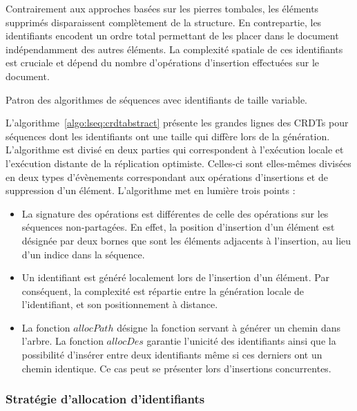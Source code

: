 Contrairement aux approches basées sur les pierres tombales, les éléments
supprimés disparaissent complètement de la structure. En contrepartie, les
identifiants encodent un ordre total permettant de les placer dans le document
indépendamment des autres éléments. La complexité spatiale de ces identifiants
est cruciale et dépend du nombre d'opérations d'insertion effectuées sur le
document.

\begin{algorithm}
  
  \caption{\label{algo:lseq:crdtabstract} Patron des algorithmes de séquences avec
    identifiants de taille variable.}
\end{algorithm}

L'algorithme~\ref{algo:lseq:crdtabstract} présente les grandes lignes des CRDTs pour
séquences dont les identifiants ont une taille qui diffère lors de la
génération. L'algorithme est divisé en deux parties qui correspondent à
l'exécution locale et l'exécution distante de la réplication
optimiste. Celles-ci sont elles-mêmes divisées en deux types d'évènements
correspondant aux opérations d'insertions et de suppression d'un
élément. L'algorithme met en lumière trois points :
\begin{itemize}
\item La signature des opérations est différentes de celle des opérations sur
  les séquences non-partagées. En effet, la position d'insertion d'un élément est
  désignée par deux bornes que sont les éléments adjacents à l'insertion, au lieu
  d'un indice dans la séquence.
\item Un identifiant est généré localement lors de l'insertion d'un élément. Par
  conséquent, la complexité est répartie entre la génération locale de
  l'identifiant, et son positionnement à distance.
\item La fonction $allocPath$ désigne la fonction servant à générer un chemin
  dans l'arbre. La fonction $allocDes$ garantie l'unicité des identifiants ainsi
  que la possibilité d'insérer entre deux identifiants même si ces derniers ont
  un chemin identique.  Ce cas peut se présenter lors d'insertions concurrentes.
\end{itemize}


\subsubsection{Stratégie d'allocation d'identifiants}

